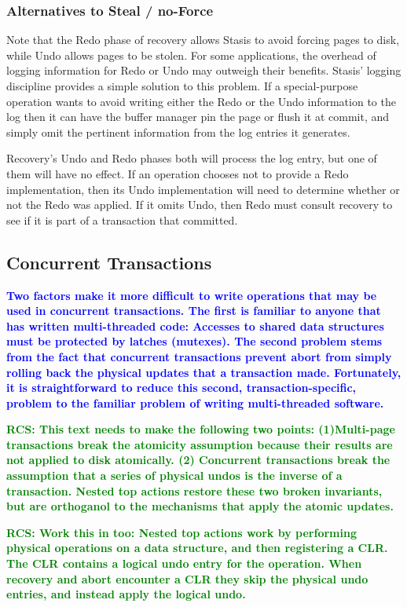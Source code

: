 \documentclass[letterpaper,twocolumn,10pt]{article}
\newcommand{\yad}{Stasis\xspace}
\newcommand{\yads}{Stasis'\xspace}
\newcommand{\diff}[1]{\textcolor{blue}{\bf #1}}
\newcommand{\rcs}[1]{\textcolor{green}{\bf RCS: #1}}
\begin{document}
\subsubsection{Alternatives to Steal / no-Force}

Note that the Redo phase of recovery allows \yad to avoid forcing
pages to disk, while Undo allows pages to be stolen.  For some
applications, the overhead of logging information for Redo or Undo may
outweigh their benefits.  \yads logging discipline provides a simple
solution to this problem.  If a special-purpose operation wants to
avoid writing either the Redo or the Undo information to the log then
it can have the buffer manager pin the page or flush it at commit, and
simply omit the pertinent information from the log entries it
generates.

Recovery's Undo and Redo phases both will process the log entry, but
one of them will have no effect.  If an operation chooses not to
provide a Redo implementation, then its Undo implementation will need
to determine whether or not the Redo was applied.  If it omits Undo,
then Redo must consult recovery to see if it is part of a transaction that
committed.

\subsection{Concurrent Transactions}

\diff{Two factors make it more difficult to write operations that may be
used in concurrent transactions.  The first is familiar to anyone that
has written multi-threaded code: Accesses to shared data structures
must be protected by latches (mutexes).  The second problem stems from
the fact that concurrent transactions prevent abort from simply
rolling back the physical updates that a transaction made.
Fortunately, it is straightforward to reduce this second,
transaction-specific, problem to the familiar problem of writing
multi-threaded software.}

\rcs{This text needs to make the following two points: (1)Multi-page transactions break the
atomicity assumption because their results are not applied to disk
atomically.  (2) Concurrent transactions break the assumption that a
series of physical undos is the inverse of a transaction.  Nested top
actions restore these two broken invariants, but are orthoganol to the
mechanisms that apply the atomic updates.}

\rcs{Work this in too:  Nested top actions work by
performing physical operations on a data structure, and then
registering a CLR.  The CLR contains a logical undo entry for the
operation.  When recovery and abort encounter a CLR they skip the
physical undo entries, and instead apply the logical undo.}
\end{document}

